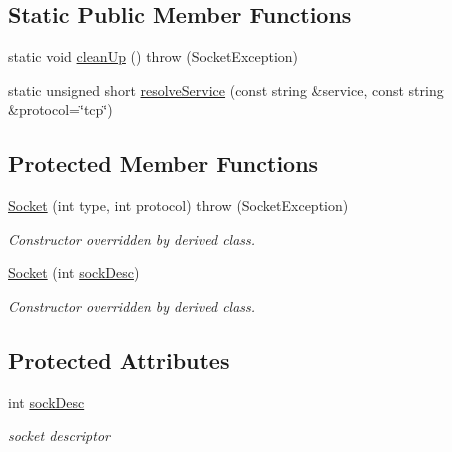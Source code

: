 \subsection*{Static Public Member Functions}
\begin{DoxyCompactItemize}
\item 
static void \hyperlink{classSocket_ac5060aeb501044044351d5a85b3fc95f}{cleanUp} ()  throw (SocketException)
\item 
static unsigned short \hyperlink{classSocket_a982c63b25c5b756321a74074a275adbc}{resolveService} (const string \&service, const string \&protocol=\char`\"{}tcp\char`\"{})
\end{DoxyCompactItemize}
\subsection*{Protected Member Functions}
\begin{DoxyCompactItemize}
\item 
\hypertarget{classSocket_a53e00027bab2125a2b407914c6148589}{
\hyperlink{classSocket_a53e00027bab2125a2b407914c6148589}{Socket} (int type, int protocol)  throw (SocketException)}
\label{classSocket_a53e00027bab2125a2b407914c6148589}

\begin{DoxyCompactList}\small\item\em Constructor overridden by derived class. \item\end{DoxyCompactList}\item 
\hypertarget{classSocket_a6a2609eef6559336a595a336f138d395}{
\hyperlink{classSocket_a6a2609eef6559336a595a336f138d395}{Socket} (int \hyperlink{classSocket_ad5704d2fdfb062139e1f88831617bbfb}{sockDesc})}
\label{classSocket_a6a2609eef6559336a595a336f138d395}

\begin{DoxyCompactList}\small\item\em Constructor overridden by derived class. \item\end{DoxyCompactList}\end{DoxyCompactItemize}
\subsection*{Protected Attributes}
\begin{DoxyCompactItemize}
\item 
\hypertarget{classSocket_ad5704d2fdfb062139e1f88831617bbfb}{
int \hyperlink{classSocket_ad5704d2fdfb062139e1f88831617bbfb}{sockDesc}}
\label{classSocket_ad5704d2fdfb062139e1f88831617bbfb}

\begin{DoxyCompactList}\small\item\em socket descriptor \item\end{DoxyCompactList}\end{DoxyCompactItemize}


